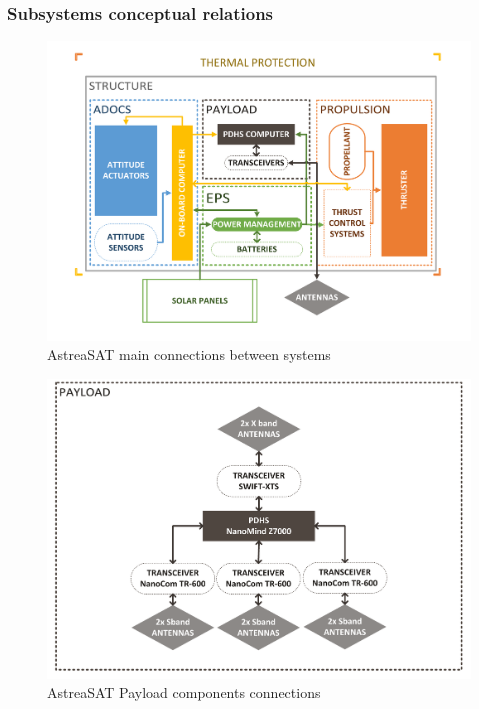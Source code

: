 \subsubsection{Subsystems conceptual relations}
\begin{landscape}
	\begin{figure}[h]
		\centering
		\includegraphics[scale=0.8]{./sections/SatelliteConfiguration/ESQUEMA_ASTREASAT}
		\caption{AstreaSAT main connections between systems}
	\end{figure}
	\begin{figure}[h]
		\centering
		\includegraphics[scale=0.8]{./sections/SatelliteConfiguration/Payload_detail}
		\caption{AstreaSAT Payload components connections}
	\end{figure}
\end{landscape}
\clearpage
%
%